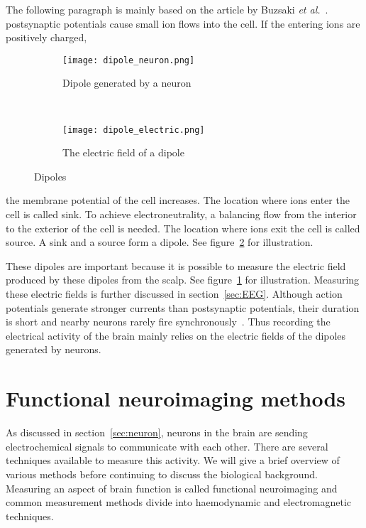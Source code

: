 The following paragraph is mainly based on the article by Buzsaki \textit{et al.}~\cite{electric_field}. \Glspl{postsynaptic potential} cause small ion flows into the cell. If the entering ions are positively charged,\begin{figure}[h!]
	\centering
	\begin{subfigure}{0.48\textwidth}
		\texttt{[image: dipole\_neuron.png]}
		\caption{Dipole generated by a neuron~\cite[p.~669]{neuroscience}}
		\label{fig:dipole_neuron}
	\end{subfigure}
	~
	\begin{subfigure}{0.48\textwidth}
		\texttt{[image: dipole\_electric.png]}
		\caption{The electric field of a dipole\protect\footnotemark}
		\label{fig:dipole_electric}
	\end{subfigure}
	\caption{Dipoles}
	\label{fig:dipole}
\end{figure} the membrane potential of the cell increases. The location where ions enter the cell is called \gls{sink}. To achieve electroneutrality, a balancing flow from the interior to the exterior of the cell is needed. The location where ions exit the cell is called \gls{source}. A \gls{sink} and a \gls{source} form a \gls{dipole}. See figure~\ref{fig:dipole_electric} for illustration.

These \glspl{dipole} are important because it is possible to measure the electric field produced by these \glspl{dipole} from the scalp. See figure~\ref{fig:dipole_neuron} for illustration. Measuring these electric fields is further discussed in section~\ref{sec:EEG}. Although \glspl{action potential} generate stronger currents than \glspl{postsynaptic potential}, their duration is short and nearby \glspl{neuron} rarely fire synchronously~\cite{electric_field}. Thus recording the electrical activity of the brain mainly relies on the electric fields of the \glspl{dipole} generated by \glspl{neuron}.

\section{Functional neuroimaging methods}
\label{sec:neuroimaging}

As discussed in section~\ref{sec:neuron}, \glspl{neuron} in the brain are sending electrochemical signals to communicate with each other. There are several techniques available to measure this activity. We will give a brief overview of various methods before continuing to discuss the biological background. Measuring an aspect of brain function is called functional neuroimaging and common measurement methods divide into haemodynamic and electromagnetic techniques.

